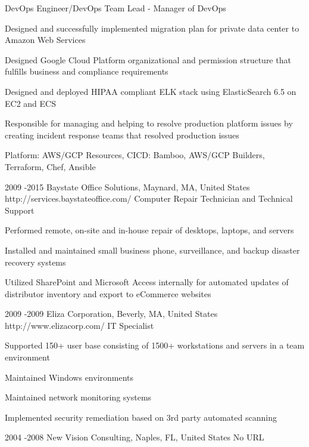 \documentclass[10pt]{article} %
\begin{document}
{DevOps Engineer/DevOps Team Lead - Manager of DevOps}
{\begin{itemize-noindent}
\item{Designed and successfully implemented migration plan for private data center to Amazon Web Services}
\item{Designed Google Cloud Platform organizational and permission structure that fulfills business and compliance requirements}
\item{Designed and deployed HIPAA compliant ELK stack using ElasticSearch 6.5 on EC2 and ECS}
\item{Responsible for managing and helping to resolve production platform issues by creating incident response teams that resolved production issues}
\item{Platform: AWS/GCP Resources, CICD: Bamboo, AWS/GCP Builders, Terraform, Chef, Ansible}
\end{itemize-noindent}}
\newpage
\job
{2009 -}{2015}
{Baystate Office Solutions, Maynard, MA, United States}
{http://services.baystateoffice.com/}
{Computer Repair Technician and Technical Support}
{\begin{itemize-noindent}
\item{Performed remote, on-site and in-house repair of desktops, laptops, and servers}
\item{Installed and maintained small business phone, surveillance, and backup disaster recovery systems}
\item{Utilized SharePoint and Microsoft Access internally for automated updates of distributor inventory and export to eCommerce websites}
\end{itemize-noindent}}
\job
{2009 -}{2009}
{Eliza Corporation, Beverly, MA, United States}
{http://www.elizacorp.com/}
{IT Specialist}
{\begin{itemize-noindent}
\item{Supported 150+ user base consisting of 1500+ workstations and servers in a team environment}
\item{Maintained Windows environments}
\item{Maintained network monitoring systems}
\item{Implemented security remediation based on 3rd party automated scanning}
\end{itemize-noindent}}
\job
{2004 -}{2008}
{New Vision Consulting, Naples, FL, United States}
{No URL}
\end{document}
